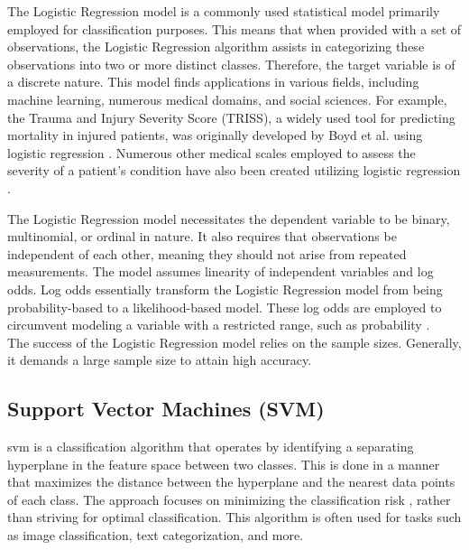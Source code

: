 The Logistic Regression model is a commonly used statistical model primarily employed for classification purposes. This means that when provided with a set of observations, the Logistic Regression algorithm assists in categorizing these observations into two or more distinct classes. Therefore, the target variable is of a discrete nature. This model finds applications in various fields, including machine learning, numerous medical domains, and social sciences. For example, the Trauma and Injury Severity Score (TRISS), a widely used tool for predicting mortality in injured patients, was originally developed by Boyd et al. using logistic regression \cite{BOYD1987}. Numerous other medical scales employed to assess the severity of a patient's condition have also been created utilizing logistic regression \cite{NLM2023, Biondo2000, J_C_Marshall2023, Jean_Roger1993}.

The Logistic Regression model necessitates the dependent variable to be binary, multinomial, or ordinal in nature. It also requires that observations be independent of each other, meaning they should not arise from repeated measurements. The model assumes linearity of independent variables and log odds. Log odds essentially transform the Logistic Regression model from being probability-based to a likelihood-based model. These log odds are employed to circumvent modeling a variable with a restricted range, such as probability \cite{LogOdd}.\\

The success of the Logistic Regression model relies on the sample sizes. Generally, it demands a large sample size to attain high accuracy.


\subsection{Support Vector Machines (SVM)} %
\label{sub: Support_Vector_Machines}

\gls{svm} is a classification algorithm that operates by identifying a separating hyperplane in the feature space between two classes. This is done in a manner that maximizes the distance between the hyperplane and the nearest data points of each class. The approach focuses on minimizing the classification risk \cite{Vladimir2013}, rather than striving for optimal classification. This algorithm is often used for tasks such as image classification, text categorization, and more.

